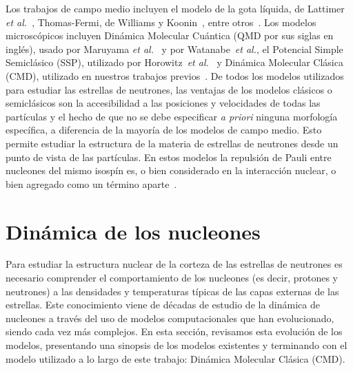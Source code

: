 Los trabajos de campo medio incluyen el modelo de la gota líquida, de Lattimer \emph{et al.}~\cite{page_minimal_2004}, Thomas-Fermi, de Williams y Koonin~\cite{williams_sub-saturation_1985}, entre otros~\cite{oyamatsu_nuclear_1993, lorenz_neutron_1993, cheng_properties_1997, watanabe_thermodynamic_2000, watanabe_electron_2003, nakazato_gyroid_2009}.
Los modelos microscópicos incluyen Dinámica Molecular Cuántica (QMD por sus siglas en inglés), usado por Maruyama \emph{et al.}~\cite{maruyama_quantum_1998, kido_md_2000} y por Watanabe~\emph{et al.}\cite{watanabe_structure_2003}, el Potencial Simple Semiclásico (SSP), utilizado por Horowitz~\emph{et al.}~\cite{horowitz_nonuniform_2004} y Dinámica Molecular Clásica (CMD), utilizado en nuestros trabajos previos~\cite{dorso_topological_2012}.
De todos los modelos utilizados para estudiar las estrellas de neutrones, las ventajas de los modelos clásicos o semiclásicos son la accesibilidad a las posiciones y velocidades de todas las partículas y el hecho de que no se debe especificar \emph{a priori} ninguna morfología específica, a diferencia de la mayoría de los modelos de campo medio.
Esto permite estudiar la estructura de la materia de estrellas de neutrones desde un punto de vista de las partículas.
En estos modelos la repulsión de Pauli entre nucleones del mismo isospín es, o bien considerado en la interacción nuclear, o bien agregado como un término aparte~\cite{dorso_classical_1988}.

\section{Dinámica de los nucleones}\label{sc:nucleon}
Para estudiar la estructura nuclear de la corteza de las estrellas de neutrones es necesario comprender el comportamiento de los nucleones (es decir, protones y neutrones) a las densidades y temperaturas típicas de las capas externas de las estrellas.
Este conocimiento viene de décadas de estudio de la dinámica de nucleones a través del uso de modelos computacionales que han evolucionado, siendo cada vez más complejos.
En esta sección, revisamos esta evolución de los modelos, presentando una sinopsis de los modelos existentes y terminando con el modelo utilizado a lo largo de este trabajo: Dinámica Molecular Clásica (CMD).

